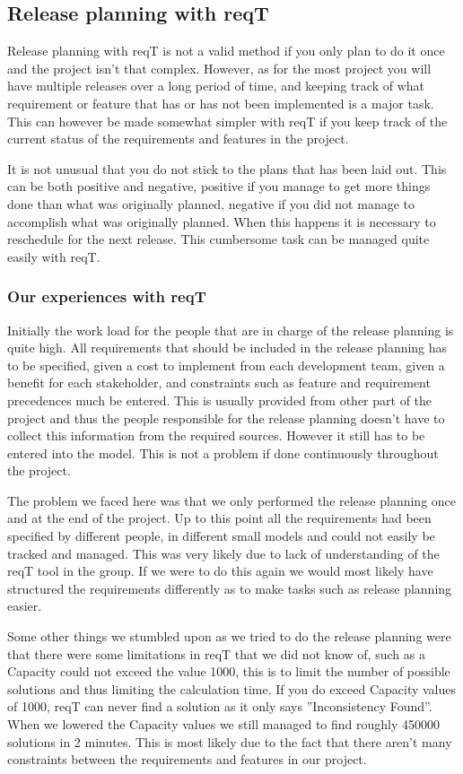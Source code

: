 \documentclass[a4paper]{article}
\begin{document}
		\subsection{Release planning with reqT}
			Release planning with reqT is not a valid method if you only plan to do it once and the project isn't that complex. However, as for the most project you will have multiple releases over a long period of time, and keeping track of what requirement or feature that has or has not been implemented is a major task. This can however be made somewhat simpler with reqT if you keep track of the current status of the requirements and features in the project.

			It is not unusual that you do not stick to the plans that has been laid out. This can be both positive and negative, positive if you manage to get more things done than what was originally planned, negative if you did not manage to accomplish what was originally planned. When this happens it is necessary to reschedule for the next release. This cumbersome task can be managed quite easily with reqT.

			\subsubsection{Our experiences with reqT}
				Initially the work load for the people that are in charge of the release planning is quite high. All requirements that should be included in the release planning has to be specified, given a cost to implement from each development team, given a benefit for each stakeholder, and constraints such as feature and requirement precedences much be entered. This is usually provided from other part of the project and thus the people responsible for the release planning doesn't have to collect this information from the required sources. However it still has to be entered into the model. This is not a problem if done continuously throughout the project.

				The problem we faced here was that we only performed the release planning once and at the end of the project. Up to this point all the requirements had been specified by different people, in different small models and could not easily be tracked and managed. This was very likely due to lack of understanding of the reqT tool in the group. If we were to do this again we would most likely have structured the requirements differently as to make tasks such as release planning easier.

				Some other things we stumbled upon as we tried to do the release planning were that there were some limitations in reqT that we did not know of, such as a Capacity could not exceed the value 1000, this is to limit the number of possible solutions and thus limiting the calculation time. If you do exceed Capacity values of 1000, reqT can never find a solution as it only says ''Inconsistency Found''. When we lowered the Capacity values we still managed to find roughly 450000 solutions in 2 minutes. This is most likely due to the fact that there aren't many constraints between the requirements and features in our project.
\end{document}
